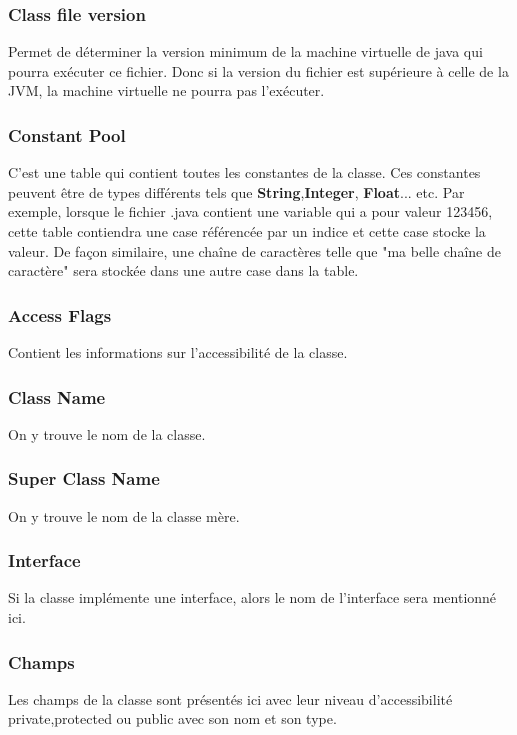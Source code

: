 \documentclass[12pt, a4paper, one side]{article}
\begin{document}
    \subsubsection{Class file version}
    Permet de déterminer la version minimum de la machine virtuelle de java qui pourra exécuter ce fichier. Donc si la version du fichier est supérieure à celle de la JVM, la machine virtuelle ne pourra pas l'exécuter.

    \subsubsection{Constant Pool}
    C'est une table qui contient toutes les constantes de la classe. Ces constantes peuvent être de types différents tels que \textbf{String},\textbf{Integer}, \textbf{Float}... etc. Par exemple, lorsque le fichier .java contient une variable qui a pour valeur 123456, cette table contiendra une case référencée par un indice et cette case stocke la valeur. De façon similaire, une chaîne de caractères telle que "ma belle chaîne de caractère" sera stockée dans une autre case dans la table.

    \subsubsection{Access Flags}
    Contient les informations sur l'accessibilité de la classe.

    \subsubsection{Class Name}
    On y trouve le nom de la classe.
    \subsubsection{Super Class Name}
    On y trouve le nom de la classe mère.

    \subsubsection{Interface}
    Si la classe implémente une interface, alors le nom de l'interface sera mentionné ici.

    \subsubsection{Champs}
    Les champs de la classe sont présentés ici avec leur niveau d'accessibilité private,protected ou public avec son nom et son type.
\end{document}

